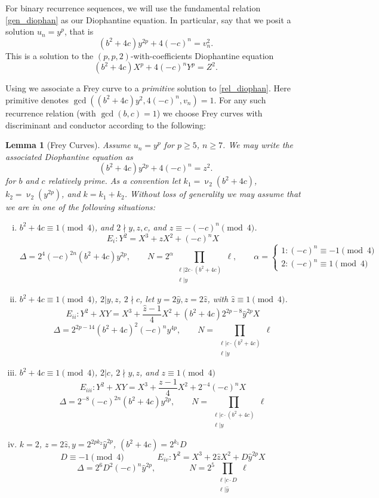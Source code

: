 \documentclass[12pt]{amsart}
\newtheorem{lem}[thm]{Lemma}
\theoremstyle{definition}
\newcommand{\notdiv}{\nmid}
\begin{document}
For binary recurrence sequences, we will use the fundamental relation \eqref{gen_diophan} as our Diophantine equation.  In particular, say that we posit a solution $u_n = y^p$, that is
\begin{equation}\label{rel_diophan} (b^2+4c)y^{2p}+4(-c)^n = v_n^2 .\end{equation}
This is a solution to the $(p,p,2)$-with-coefficients Diophantine equation
\[ (b^2+4c)X^p +4(-c)^nY^p = Z^2. \]

Using \cite{bennett04} we associate a Frey curve to a \textit{primitive} solution to \eqref{rel_diophan}.  Here primitive denotes $\gcd((b^2+4c)y^2, 4(-c)^n, v_n ) = 1$.  For any such recurrence relation (with $\gcd(b,c)=1$) we choose Frey curves with discriminant and conductor according to the following:

\begin{lem}[Frey Curves]\label{freycurves}
Assume $u_n = y^p$ for $p\geq 5$, $n \geq 7$.  We may write the associated Diophantine equation as
\[ (b^2+4c)y^{2p} + 4(-c)^n = z^2.\]
for $b$ and $c$ relatively prime. As a convention let $k_1 = \upnu_2(b^2+4c)$, $k_2 = \upnu_2(y^{2p})$, and $k = k_1+k_2$.  Without loss of generality we may assume that we are in one of the following situations:



\begin{enumerate}[(i)]

\item $b^2+4c \equiv 1 \pmod{4}$, and $2 \notdiv y,z,c$, and $z \equiv -(-c)^n \pmod{4}$.
\[ E_i: Y^2 = X^3 + zX^2 + (-c)^nX \]
\[ \Delta = 2^4(-c)^{2n}(b^2+4c)y^{2p},  \qquad N = 2^{\alpha} \prod_{\substack{ \ell | 2c \cdot (b^2+4c) \\ \ell | y}} \ell, \qquad \alpha =  \begin{cases} 1: (-c)^n \equiv -1 \pmod{4}\\ 2 : (-c)^n \equiv 1 \pmod{4} \end{cases} \]
\item $b^2+4c \equiv 1 \pmod{4}$, $2|y,z$, $2 \notdiv c$, let $y = 2\hat{y}, z = 2\hat{z}$, with $\hat{z} \equiv 1 \pmod{4}$.
\[ E_{ii} : Y^2 +XY = X^3 + \frac{\hat{z} - 1}{4} X^2 + (b^2+4c)2^{2p-8}\hat{y}^{2p}X \]
\[ \Delta = 2^{2p-14}(b^2+4c)^2(-c)^ny^{4p}, \qquad N = \prod_{\substack{ \ell | c \cdot (b^2+4c) \\ \ell | y}} \ell  \]
\item $b^2+4c \equiv 1 \pmod{4}$, $2|c$, $2 \notdiv y,z$, and $z \equiv 1 \pmod{4}$
\[ E_{iii}: Y^2 +XY = X^3 +\frac{z-1}{4}X^2 +2^{-4}(-c)^nX \]
\[ \Delta = 2^{-8}(-c)^{2n}(b^2+4c)y^{2p} , \qquad N = \prod_{\substack{ \ell | c \cdot (b^2+4c) \\ \ell | y}} \ell  \]
\item $k = 2$, $z = 2 \hat{z}, y = 2^{2pk_2}\hat{y}^{2p}$, $(b^2+4c) = 2^{k_1}D$
\[D \equiv -1 \pmod{4} \qquad \qquad E_{iv} : Y^2 = X^3 +2\hat{z}X^2 +D\hat{y}^{2p}X \]
\[\Delta = 2^{6}D^2(-c)^n\hat{y}^{2p}, \qquad \qquad N = 2^{5}\prod_{\substack{ \ell | c \cdot D \\ \ell | \hat{y}}} \ell  \]


\end{enumerate}
\end{lem}
\end{document}
